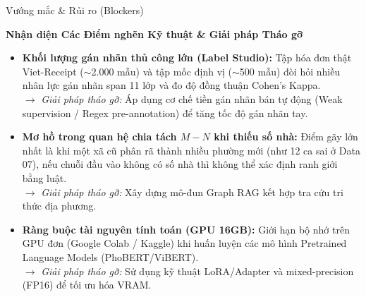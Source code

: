 \documentclass[aspectratio=169,9pt]{beamer}
\begin{document}
\begin{frame}{Vướng mắc \& Rủi ro (Blockers)}
  \vspace{-0.05cm}
  \centerline{\large\textbf{Nhận diện Các Điểm nghẽn Kỹ thuật \& Giải pháp Tháo gỡ}}
  \vspace{0.15cm}

  {\small
  \begin{itemize}
    \setlength{\itemsep}{3.5pt}
    \item \textbf{Khối lượng gán nhãn thủ công lớn (Label Studio):} Tập hóa đơn thật Viet-Receipt ($\sim$2.000 mẫu) và tập mốc định vị ($\sim$500 mẫu) đòi hỏi nhiều nhân lực gán nhãn span 11 lớp và đo độ đồng thuận Cohen's Kappa.\\
      $\to$ \textit{Giải pháp tháo gỡ:} Áp dụng cơ chế tiền gán nhãn bán tự động (Weak supervision / Regex pre-annotation) để tăng tốc độ gán nhãn tay.
    \item \textbf{Mơ hồ trong quan hệ chia tách $M - N$ khi thiếu số nhà:} Điểm gãy lớn nhất là khi một xã cũ phân rã thành nhiều phường mới (như 12 ca sai ở Data 07), nếu chuỗi đầu vào không có số nhà thì không thể xác định ranh giới bằng luật.\\
      $\to$ \textit{Giải pháp tháo gỡ:} Xây dựng mô-đun Graph RAG kết hợp tra cứu tri thức địa phương.
    \item \textbf{Ràng buộc tài nguyên tính toán (GPU 16GB):} Giới hạn bộ nhớ trên GPU đơn (Google Colab / Kaggle) khi huấn luyện các mô hình Pretrained Language Models (PhoBERT/ViBERT).\\
      $\to$ \textit{Giải pháp tháo gỡ:} Sử dụng kỹ thuật LoRA/Adapter và mixed-precision (FP16) để tối ưu hóa VRAM.
  \end{itemize}
  }
\end{frame}
\end{document}
